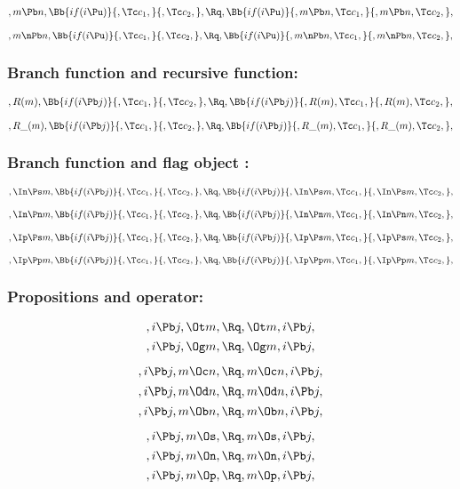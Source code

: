 \[,m \Pb n, \Bb{if(i \Pu)}{,\Tc c_1,}{,\Tc c_2,}, \Rq , \Bb{if(i \Pu)}{,m \Pb n,\Tc c_1,}{,m \Pb n,\Tc c_2,},\]
\bigskip
\bigskip

\[,m \nPb n, \Bb{if(i \Pu)}{,\Tc c_1,}{,\Tc c_2,}, \Rq , \Bb{if(i \Pu)}{,m \nPb n,\Tc c_1,}{,m \nPb n,\Tc c_2,},\]
\bigskip
\bigskip



\bigskip
\bigskip
\bigskip
\bigskip
\subsubsection{Branch function and recursive function:}
\[,R(m), \Bb{if(i \Pb j)}{,\Tc c_1,}{,\Tc c_2,}, \Rq , \Bb{if(i \Pb j)}{,R(m),\Tc c_1,}{,R(m),\Tc c_2,},\]
\bigskip
\bigskip

\[,R\_(m), \Bb{if(i \Pb j)}{,\Tc c_1,}{,\Tc c_2,}, \Rq , \Bb{if(i \Pb j)}{,R\_(m),\Tc c_1,}{,R\_(m),\Tc c_2,},\]
\bigskip
\bigskip


\bigskip
\bigskip
\bigskip
\bigskip
\subsubsection{Branch function and flag object :}
\[,\In \Ps m, \Bb{if(i \Pb j)}{,\Tc c_1,}{,\Tc c_2,}, \Rq , \Bb{if(i \Pb j)}{,\In \Ps m,\Tc c_1,}{,\In \Ps m,\Tc c_2,},\]
\bigskip
\bigskip

\[,\In \Pn m, \Bb{if(i \Pb j)}{,\Tc c_1,}{,\Tc c_2,}, \Rq , \Bb{if(i \Pb j)}{,\In \Pn m,\Tc c_1,}{,\In \Pn m,\Tc c_2,},\]
\bigskip
\bigskip

\[,\Ip \Ps m, \Bb{if(i \Pb j)}{,\Tc c_1,}{,\Tc c_2,}, \Rq , \Bb{if(i \Pb j)}{,\Ip \Ps m,\Tc c_1,}{,\Ip \Ps m,\Tc c_2,},\]
\bigskip
\bigskip

\[,\Ip \Pp m, \Bb{if(i \Pb j)}{,\Tc c_1,}{,\Tc c_2,}, \Rq , \Bb{if(i \Pb j)}{,\Ip \Pp m,\Tc c_1,}{,\Ip \Pp m,\Tc c_2,},\]
\bigskip
\bigskip




\bigskip
\bigskip
\bigskip
\bigskip
\subsubsection{ Propositions and operator:}
\[, i \Pb j, \Ot m, \Rq , \Ot m, i \Pb j,\]
\[, i \Pb j, \Og m, \Rq , \Og m, i \Pb j,\]

\[, i \Pb j, m \Oc n, \Rq , m \Oc n, i \Pb j,\]
\[, i \Pb j, m \Od n, \Rq , m \Od n, i \Pb j,\]
\[, i \Pb j, m \Ob n, \Rq , m \Ob n, i \Pb j,\]

\[, i \Pb j, m \Os, \Rq , m \Os, i \Pb j,\]
\[, i \Pb j, m \On, \Rq , m \On, i \Pb j,\]
\[, i \Pb j, m \Op, \Rq , m \Op, i \Pb j,\]

